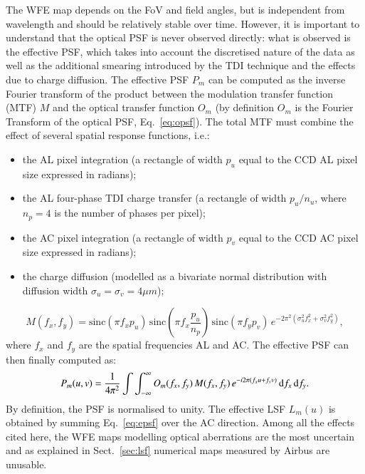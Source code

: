 \documentclass{aa}
\newcommand{\secname}{Sect.}
\newcommand{\equref}[1]{Eq.~\ref{eq:#1}}
\newcommand{\secref}[1]{\secname~\ref{sec:#1}}
\begin{document}
\begin{appendix}
The WFE map depends on the FoV and field angles, but is independent from wavelength and should be relatively stable over time.
However, it is important to understand that the optical PSF is never observed directly: what is observed is the effective PSF, which takes into account the discretised nature of the data as well as the additional smearing introduced by the TDI technique and the effects due to charge diffusion.
The effective PSF $P_m$ can be computed as the inverse Fourier transform of the product between the modulation transfer function (MTF) $M$ and the optical transfer function $O_m$ 
(by definition $O_m$ is the Fourier Transform of the optical PSF, \equref{opsf}).
The total MTF must combine the effect of several spatial response functions, i.e.:
\begin{itemize}
    \item the AL pixel integration (a rectangle of width $p_u$ equal to the CCD AL pixel size expressed in radians);%
    \item the AL four-phase TDI charge transfer (a rectangle of width $p_u/n_u$, where $n_p = 4$ is the number of phases per pixel);
    \item the AC pixel integration (a rectangle of width $p_v$ equal to the CCD AC pixel size expressed in radians);
    \item the charge diffusion (modelled as a bivariate normal distribution with diffusion width $\sigma_u = \sigma_v = 4 \mu m$);
\end{itemize}
\begin{equation}
    M(f_x, f_y) = \mathrm{sinc} (\pi f_x p_u) \,
                  \mathrm{sinc} \left(\pi f_x \frac{p_u}{n_p}\right) \,
                  \mathrm{sinc}(\pi f_y p_v) \,
                  e^{-2\pi^2\left(\sigma^2_u f^2_x + \sigma^2_v f^2_y\right)}
,\end{equation}
where $f_x$ and $f_y$ are the spatial frequencies AL and AC.
The effective PSF can then finally computed as:
\begin{equation}
    P_m(u, v) = \frac{1}{4\pi^2} \int \int_{-\infty}^{\infty} O_m(f_x,f_y)\,
    M(f_x, f_y)\,
    e^{-i2\pi (f_x u + f_y v)}  \, {\rm d}f_x \, {\rm d}f_y
    \label{eq:epsf}
.\end{equation}
By definition, the PSF is normalised to unity. The effective LSF $L_m(u)$ is obtained by summing \equref{epsf} over the AC direction.
Among all the effects cited here, the WFE maps modelling optical aberrations are the most uncertain
and as explained in \secref{lsf} numerical maps measured by Airbus are unusable. 

\end{appendix}
\end{document}
